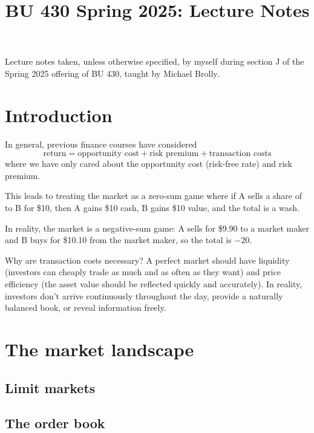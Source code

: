 \documentclass[class=bu430,notes,tikz]{agony}
\title{BU 430 Spring 2025: Lecture Notes}
\begin{document}
\renewcommand{\contentsname}{BU 430 Spring 2025:\\{\huge Lecture Notes}}
\thispagestyle{firstpage}
\tableofcontents

Lecture notes taken, unless otherwise specified,
by myself during section J of the Spring 2025 offering of BU 430,
taught by Michael Brolly.

\begin{multicols}{2}
  \listoflecture
\end{multicols}

\chapter{Introduction}

In general, previous finance courses have considered
\[ \text{return} = \text{opportunity cost} + \text{risk premium} + \text{transaction costs} \]
where we have only cared about the opportunity cost (risk-free rate)
and risk premium.

This leads to treating the market as a zero-sum game
where if A sells a share of  to B for \$10,
then A gains \$10 cash, B gains \$10 value, and the total is a wash.

In reality, the market is a negative-sum game:
A sells for \$9.90 to a market maker and B buys for \$10.10 from the market maker,
so the total is $-20$\textcent.

Why are transaction costs necessary?
A perfect market should have liquidity (investors can cheaply trade as much and as often as they want)
and price efficiency (the asset value should be reflected quickly and accurately).
In reality, investors don't arrive continuously throughout the day,
provide a naturally balanced book, or reveal information freely.


\chapter{The market landscape}


\section{Limit markets}

\section{The order book}
\end{document}
